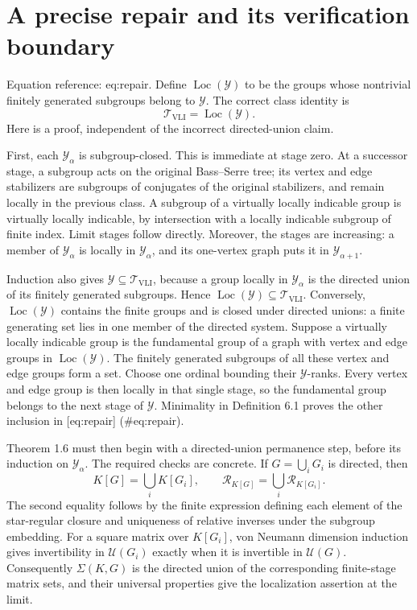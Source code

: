 \documentclass[10pt]{article}
\begin{document}
\section*{A precise repair and its verification boundary}
Equation reference: eq:repair. Define \(\operatorname{Loc}(\mathcal Y)\) to be the groups whose nontrivial finitely generated subgroups belong to \(\mathcal Y\). The correct class identity is \[
 \mathcal T_{\mathrm{VLI}}=\operatorname{Loc}(\mathcal Y).\] Here is a proof, independent of the incorrect directed-union claim.\par
First, each \(\mathcal Y_\alpha\) is subgroup-closed. This is immediate at stage zero. At a successor stage, a subgroup acts on the original Bass–Serre tree; its vertex and edge stabilizers are subgroups of conjugates of the original stabilizers, and remain locally in the previous class. A subgroup of a virtually locally indicable group is virtually locally indicable, by intersection with a locally indicable subgroup of finite index. Limit stages follow directly. Moreover, the stages are increasing: a member of \(\mathcal Y_\alpha\) is locally in \(\mathcal Y_\alpha\), and its one-vertex graph puts it in \(\mathcal Y_{\alpha+1}\).\par
Induction also gives \(\mathcal Y\subseteq\mathcal T_{\mathrm{VLI}}\), because a group locally in \(\mathcal Y_\alpha\) is the directed union of its finitely generated subgroups. Hence \(\operatorname{Loc}(\mathcal Y)\subseteq\mathcal T_{\mathrm{VLI}}\). Conversely, \(\operatorname{Loc}(\mathcal Y)\) contains the finite groups and is closed under directed unions: a finite generating set lies in one member of the directed system. Suppose a virtually locally indicable group is the fundamental group of a graph with vertex and edge groups in \(\operatorname{Loc}(\mathcal Y)\). The finitely generated subgroups of all these vertex and edge groups form a set. Choose one ordinal bounding their \(\mathcal Y\)-ranks. Every vertex and edge group is then locally in that single stage, so the fundamental group belongs to the next stage of \(\mathcal Y\). Minimality in Definition 6.1 proves the other inclusion in [eq:repair] (\#eq:repair).\par
Theorem 1.6 must then begin with a directed-union permanence step, before its induction on \(\mathcal Y_\alpha\). The required checks are concrete. If \(G=\bigcup_iG_i\) is directed, then \[K[G]=\bigcup_iK[G_i],\qquad
 \mathcal R_{K[G]}=\bigcup_i\mathcal R_{K[G_i]}.\] The second equality follows by the finite expression defining each element of the star-regular closure and uniqueness of relative inverses under the subgroup embedding. For a square matrix over \(K[G_i]\), von Neumann dimension induction gives invertibility in \(\mathcal U(G_i)\) exactly when it is invertible in \(\mathcal U(G)\). Consequently \(\Sigma(K,G)\) is the directed union of the corresponding finite-stage matrix sets, and their universal properties give the localization assertion at the limit.\par
\end{document}
